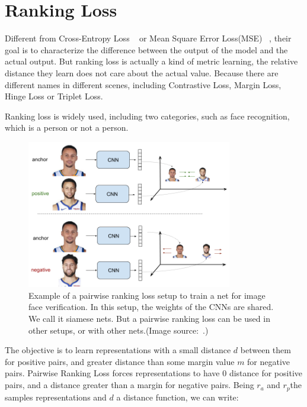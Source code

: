\label{sec:rankingloss}
\section{Ranking Loss}

Different from Cross-Entropy Loss ~\cite{Categorical_Loss} or Mean Square Error Loss(MSE) ~\cite{CHRISTOFFERSEN2004291}, their goal is to characterize the difference between the output of the model and the actual output. But ranking loss is actually a kind of metric learning, the relative distance they learn does not care about the actual value. Because there are different names in different scenes, including Contrastive Loss, Margin Loss, Hinge Loss or Triplet Loss.

Ranking loss is widely used, including two categories, such as face recognition, which is a person or not a person.

\begin{figure}[!htbp]
	\centering
	\includegraphics[width = 0.8\textwidth]{figures/pairwise_ranking_loss_faces.png}
	\caption[Example of a pairwise ranking loss ]
	{ Example of a pairwise ranking loss setup to train a net for image face verification. In this setup, the weights of the CNNs are shared. We call it siamese nets. But a pairwise ranking loss can be used in other setups, or with other nets.(Image source:~\cite{triplet_loss_em}.)}
	\label{fig:pairwise_ranking_loss}
\end{figure}


The objective is to learn representations with a small distance $d$ between them for positive pairs, and greater distance than some margin value $m$ for negative pairs. Pairwise Ranking Loss forces representations to have $0$ distance for positive pairs, and a distance greater than a margin for negative pairs. Being $r_a$ and $r_p$the samples representations and $d$ a distance function, we can write:

